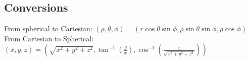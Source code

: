 \subsection{Conversions}
\noindent
From spherical to Cartesian: $(\rho, \theta, \phi) = (r\cos{\theta}\sin{\phi}, \rho\sin{\theta}\sin{\phi}, \rho\cos{\phi})$\\
From Cartesian to Spherical: $(x, y, z)=\left(\sqrt{x^2 + y^2 + z^2}, \tan^{-1}{\left(\frac{y}{x}\right)}, \cos^{-1}{\left(\frac{z}{\sqrt{x^2 + y^2 + z^2}}\right)}\right)$